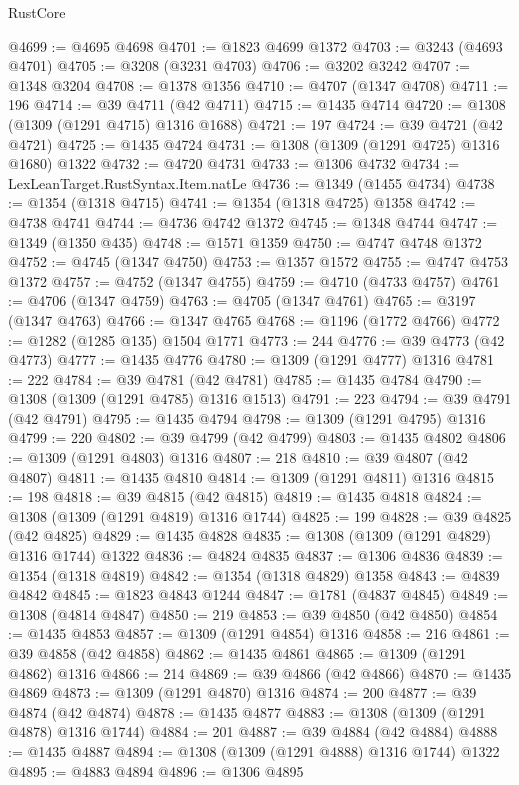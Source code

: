 \begin{lexlean}{RustCore}
\begin{coremodule}
@4699 := @4695 @4698
@4701 := @1823 @4699 @1372
@4703 := @3243 (@4693 @4701)
@4705 := @3208 (@3231 @4703)
@4706 := @3202 @3242
@4707 := @1348 @3204
@4708 := @1378 @1356
@4710 := @4707 (@1347 @4708)
@4711 := 196
@4714 := @39 @4711 (@42 @4711)
@4715 := @1435 @4714
@4720 := @1308 (@1309 (@1291 @4715) @1316 @1688)
@4721 := 197
@4724 := @39 @4721 (@42 @4721)
@4725 := @1435 @4724
@4731 := @1308 (@1309 (@1291 @4725) @1316 @1680) @1322
@4732 := @4720 @4731
@4733 := @1306 @4732
@4734 := LexLeanTarget.RustSyntax.Item.natLe
@4736 := @1349 (@1455 @4734)
@4738 := @1354 (@1318 @4715)
@4741 := @1354 (@1318 @4725) @1358
@4742 := @4738 @4741
@4744 := @4736 @4742 @1372
@4745 := @1348 @4744
@4747 := @1349 (@1350 @435)
@4748 := @1571 @1359
@4750 := @4747 @4748 @1372
@4752 := @4745 (@1347 @4750)
@4753 := @1357 @1572
@4755 := @4747 @4753 @1372
@4757 := @4752 (@1347 @4755)
@4759 := @4710 (@4733 @4757)
@4761 := @4706 (@1347 @4759)
@4763 := @4705 (@1347 @4761)
@4765 := @3197 (@1347 @4763)
@4766 := @1347 @4765
@4768 := @1196 (@1772 @4766)
@4772 := @1282 (@1285 @135) @1504 @1771
@4773 := 244
@4776 := @39 @4773 (@42 @4773)
@4777 := @1435 @4776
@4780 := @1309 (@1291 @4777) @1316
@4781 := 222
@4784 := @39 @4781 (@42 @4781)
@4785 := @1435 @4784
@4790 := @1308 (@1309 (@1291 @4785) @1316 @1513)
@4791 := 223
@4794 := @39 @4791 (@42 @4791)
@4795 := @1435 @4794
@4798 := @1309 (@1291 @4795) @1316
@4799 := 220
@4802 := @39 @4799 (@42 @4799)
@4803 := @1435 @4802
@4806 := @1309 (@1291 @4803) @1316
@4807 := 218
@4810 := @39 @4807 (@42 @4807)
@4811 := @1435 @4810
@4814 := @1309 (@1291 @4811) @1316
@4815 := 198
@4818 := @39 @4815 (@42 @4815)
@4819 := @1435 @4818
@4824 := @1308 (@1309 (@1291 @4819) @1316 @1744)
@4825 := 199
@4828 := @39 @4825 (@42 @4825)
@4829 := @1435 @4828
@4835 := @1308 (@1309 (@1291 @4829) @1316 @1744) @1322
@4836 := @4824 @4835
@4837 := @1306 @4836
@4839 := @1354 (@1318 @4819)
@4842 := @1354 (@1318 @4829) @1358
@4843 := @4839 @4842
@4845 := @1823 @4843 @1244
@4847 := @1781 (@4837 @4845)
@4849 := @1308 (@4814 @4847)
@4850 := 219
@4853 := @39 @4850 (@42 @4850)
@4854 := @1435 @4853
@4857 := @1309 (@1291 @4854) @1316
@4858 := 216
@4861 := @39 @4858 (@42 @4858)
@4862 := @1435 @4861
@4865 := @1309 (@1291 @4862) @1316
@4866 := 214
@4869 := @39 @4866 (@42 @4866)
@4870 := @1435 @4869
@4873 := @1309 (@1291 @4870) @1316
@4874 := 200
@4877 := @39 @4874 (@42 @4874)
@4878 := @1435 @4877
@4883 := @1308 (@1309 (@1291 @4878) @1316 @1744)
@4884 := 201
@4887 := @39 @4884 (@42 @4884)
@4888 := @1435 @4887
@4894 := @1308 (@1309 (@1291 @4888) @1316 @1744) @1322
@4895 := @4883 @4894
@4896 := @1306 @4895

\end{coremodule}
\end{lexlean}
